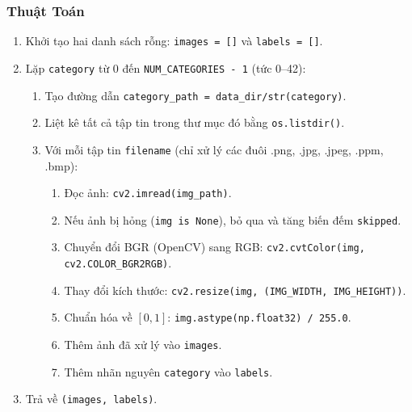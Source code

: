 \documentclass[12pt,a4paper]{article}
\begin{document}
\subsubsection*{Thuật Toán}
\begin{enumerate}[leftmargin=*]
    \item Khởi tạo hai danh sách rỗng: \texttt{images = []} và \texttt{labels = []}.
    \item Lặp \texttt{category} từ 0 đến \texttt{NUM\_CATEGORIES - 1} (tức 0--42):
    \begin{enumerate}
        \item Tạo đường dẫn \texttt{category\_path = data\_dir/str(category)}.
        \item Liệt kê tất cả tập tin trong thư mục đó bằng \texttt{os.listdir()}.
        \item Với mỗi tập tin \texttt{filename} (chỉ xử lý các đuôi .png, .jpg, .jpeg, .ppm, .bmp):
        \begin{enumerate}
            \item Đọc ảnh: \texttt{cv2.imread(img\_path)}.
            \item Nếu ảnh bị hỏng (\texttt{img is None}), bỏ qua và tăng biến đếm \texttt{skipped}.
            \item Chuyển đổi BGR (OpenCV) sang RGB: \texttt{cv2.cvtColor(img, cv2.COLOR\_BGR2RGB)}.
            \item Thay đổi kích thước: \texttt{cv2.resize(img, (IMG\_WIDTH, IMG\_HEIGHT))}.
            \item Chuẩn hóa về $[0,1]$: \texttt{img.astype(np.float32) / 255.0}.
            \item Thêm ảnh đã xử lý vào \texttt{images}.
            \item Thêm nhãn nguyên \texttt{category} vào \texttt{labels}.
        \end{enumerate}
    \end{enumerate}
    \item Trả về \texttt{(images, labels)}.
\end{enumerate}
\end{document}
